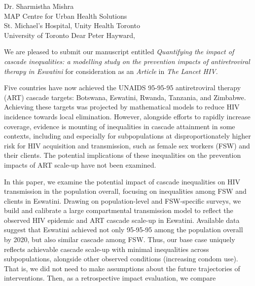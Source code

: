 \address{
  Peter Hayward\\
  Editor-in-Chief\\
  The Lancet HIV
}{Dr. Sharmistha Mishra\\
  MAP Centre for Urban Health Solutions\\
  St. Michael's Hospital, Unity Health Toronto\\
  University of Toronto}
Dear Peter Hayward,
\par
We are pleased to submit our manuscript entitled
\emph{Quantifying the impact of cascade inequalities:
  a modelling study on the prevention impacts of antiretroviral therapy in Eswatini}
for consideration as an \emph{Article} in \emph{The Lancet HIV}.
\par
Five countries have now achieved
the UNAIDS 95-95-95 antiretroviral therapy (ART) cascade targets:
Botswana, Eswatini, Rwanda, Tanzania, and Zimbabwe.
Achieving these targets was projected by
mathematical models to reduce HIV incidence towards local elimination.
However, alongside efforts to rapidly increase coverage,
evidence is mounting of inequalities in cascade attainment in some contexts,
including and especially for subpopulations
at disproportionately higher risk for HIV acquisition and transmission,
such as female sex workers (FSW) and their clients.
The potential implications of these inequalities on
the prevention impacts of ART scale-up have not been examined.
\par
In this paper, we examine the potential impact of
cascade inequalities on HIV transmission in the population overall,
focusing on inequalities among FSW and clients in Eswatini.
Drawing on population-level and FSW-specific surveys,
we build and calibrate a large compartmental transmission model
to reflect the observed HIV epidemic and ART cascade scale-up in Eswatini.
Available data suggest that Eswatini achieved not only
95-95-95 among the population overall by 2020, but also similar cascade among FSW.
Thus, our base case uniquely reflects achievable cascade scale-up
with minimal inequalities across subpopulations,
alongside other observed conditions (\eg increasing condom use).
That is, we did not need to make assumptions about
the future trajectories of interventions.
Then, as a retrospective impact evaluation, we compare
